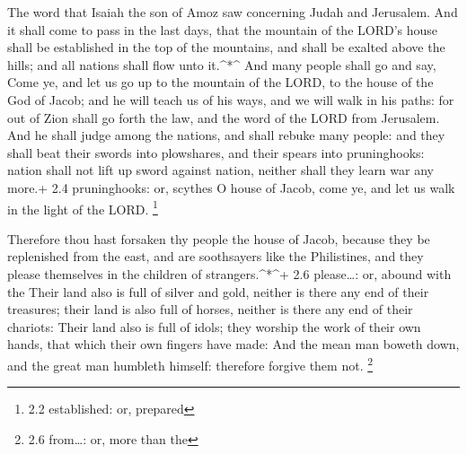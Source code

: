  The word that Isaiah the son of Amoz saw concerning Judah
and Jerusalem.  And it shall come to pass in the last days,
that the mountain of the LORD's house shall be established in the top of
the mountains, and shall be exalted above the hills; and all nations
shall flow unto it.\^{}*\^{}  And many people shall go and
say, Come ye, and let us go up to the mountain of the LORD, to the house
of the God of Jacob; and he will teach us of his ways, and we will walk
in his paths: for out of Zion shall go forth the law, and the word of
the LORD from Jerusalem.  And he shall judge among the
nations, and shall rebuke many people: and they shall beat their swords
into plowshares, and their spears into pruninghooks: nation shall not
lift up sword against nation, neither shall they learn war any more.+
2.4 pruninghooks: or, scythes  O house of Jacob, come ye,
and let us walk in the light of the LORD. \footnote{2.2 established: or,
  prepared}

 Therefore thou hast forsaken thy people the house of Jacob,
because they be replenished from the east, and are soothsayers like the
Philistines, and they please themselves in the children of
strangers.\^{}*\^{}+ 2.6 please\ldots: or, abound with the 
Their land also is full of silver and gold, neither is there any end of
their treasures; their land is also full of horses, neither is there any
end of their chariots:  Their land also is full of idols;
they worship the work of their own hands, that which their own fingers
have made:  And the mean man boweth down, and the great man
humbleth himself: therefore forgive them not. \footnote{2.6 from\ldots:
  or, more than the}


